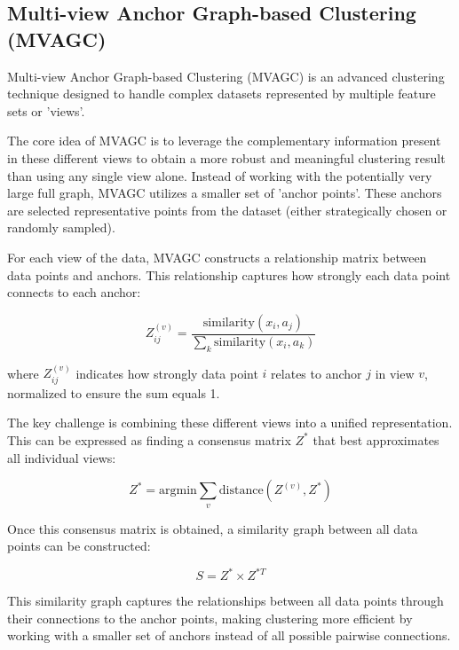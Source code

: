 \subsection{Multi-view Anchor Graph-based Clustering (MVAGC)}
\label{subsec:MVAGC}

Multi-view Anchor Graph-based Clustering (MVAGC) is an advanced clustering technique designed to handle complex datasets represented by multiple feature sets or 'views'. 

The core idea of MVAGC is to leverage the complementary information present in these different views to obtain a more robust and meaningful clustering result than using any single view alone. Instead of working with the potentially very large full graph, MVAGC utilizes a smaller set of 'anchor points'. These anchors are selected representative points from the dataset (either strategically chosen or randomly sampled).

For each view of the data, MVAGC constructs a relationship matrix between data points and anchors. This relationship captures how strongly each data point connects to each anchor:

\begin{equation}
Z_{ij}^{(v)} = \frac{\text{similarity}(x_i, a_j)}{\sum_k \text{similarity}(x_i, a_k)}
\end{equation}

where $Z_{ij}^{(v)}$ indicates how strongly data point $i$ relates to anchor $j$ in view $v$, normalized to ensure the sum equals 1.

The key challenge is combining these different views into a unified representation. This can be expressed as finding a consensus matrix $Z^*$ that best approximates all individual views:

\begin{equation}
Z^* = \text{argmin} \sum_{v} \text{distance}(Z^{(v)}, Z^*)
\end{equation}

Once this consensus matrix is obtained, a similarity graph between all data points can be constructed:

\begin{equation}
S = Z^* \times Z^{*T}
\end{equation}

This similarity graph captures the relationships between all data points through their connections to the anchor points, making clustering more efficient by working with a smaller set of anchors instead of all possible pairwise connections.


